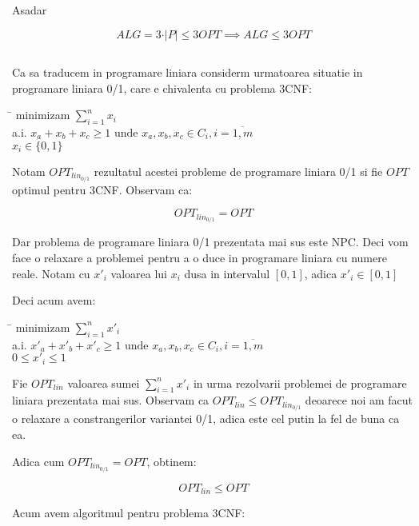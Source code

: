 \documentclass[a4paper]{report} %
\begin{document}
Asadar

\[ALG=3\cdot \vert P\vert \leq 3OPT \implies ALG\leq 3OPT\]

\subsection{}
Ca sa traducem in programare liniara considerm urmatoarea situatie in programare liniara 0/1, care e chivalenta cu problema 3CNF:

\begin{tabbing}
\hspace{2em}\= \kill 
minimizam $\sum_{i=1}^{n}x_{i}$ \\
a.i. \> $x_{a}+x_{b}+x_{c}\geq 1 \text{ unde } x_{a},x_{b},x_{c}\in C_{i}, i=\overline{1,m}$ \\
\> $x_{i}\in \{0, 1\}$
\end{tabbing}
Notam $OPT_{lin_{0/1}}$ rezultatul acestei probleme de programare liniara 0/1 si fie $OPT$ optimul pentru 3CNF. Observam ca:

\[OPT_{lin_{0/1}}=OPT\]

Dar problema de programare liniara 0/1 prezentata mai sus este NPC. Deci vom face o relaxare a problemei pentru a o duce in programare liniara cu numere reale. 
Notam cu $x'_{i}$ valoarea lui $x_{i}$ dusa in intervalul $[0,1]$, adica $x'_{i}\in [0,1]$

Deci acum avem:

\begin{tabbing}
\hspace{2em}\= \kill 
minimizam $\sum_{i=1}^{n}x'_{i}$ \\
a.i. \> $x'_{a}+x'_{b}+x'_{c}\geq 1 \text{ unde } x_{a},x_{b},x_{c}\in C_{i}, i=\overline{1,m}$ \\
\> $0\leq x'_{i}\leq 1$
\end{tabbing}

Fie $OPT_{lin}$ valoarea sumei $\sum_{i=1}^{n}x'_{i}$ in urma rezolvarii problemei de programare liniara prezentata mai sus.
Observam ca $OPT_{lin}\leq OPT_{lin_{0/1}}$ deoarece noi am facut o relaxare a constrangerilor variantei 0/1, adica este cel putin la fel de buna ca ea.

Adica cum $OPT_{lin_{0/1}}=OPT$, obtinem:

\[OPT_{lin}\leq OPT\]

Acum avem algoritmul pentru problema 3CNF:
\end{document}
